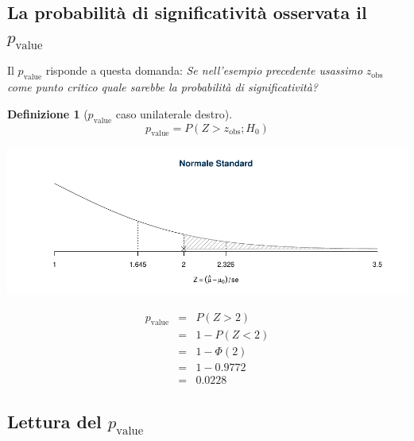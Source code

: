 \documentclass[
  11pt,
]{book}
\theoremstyle{mytheoremstyle}
\theoremstyle{mydefstyle}
\newtheorem{definition}{Definizione}[section]
\begin{document}
\subsection{\texorpdfstring{La probabilità di significatività osservata il \(p_\text{value}\)}{La probabilità di significatività osservata il p\_\textbackslash text\{value\}}}\label{la-probabilituxe0-di-significativituxe0-osservata-il-p_textvalue}

Il \(p_\text{value}\) risponde a questa domanda: \emph{Se nell'esempio
precedente usassimo} \(z_{\text{obs}}\) \emph{come punto critico quale sarebbe
la probabilità di significatività?}

\begin{info}

\begin{definition}[$p_\text{value}$ caso unilaterale destro]
\[p_\text{value}=P(Z>z_{\text{obs}};H_0)\]
\end{definition}

\end{info}

\begin{center}\includegraphics{Appunti_di_Statistica_2025_files/figure-latex/15-test-mu-pi-16-1} \end{center}

\begin{eqnarray*}
p_{\text{value}}&=& P(Z>2) \\
                &=& 1-P(Z<2)\\
                &=& 1-\Phi(2)\\
                &=& 1-0.9772\\
                &=& 0.0228
\end{eqnarray*}

\subsection{\texorpdfstring{Lettura del \(p_\text{value}\)}{Lettura del p\_\textbackslash text\{value\}}}\label{lettura-del-p_textvalue}
\end{document}
